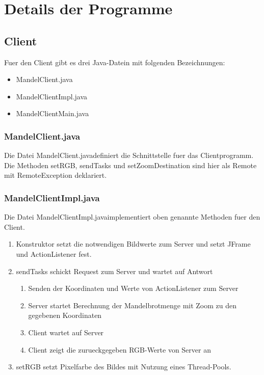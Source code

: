 \documentclass{article}
\begin{document}
\section{Details der Programme}
\subsection{Client}
	Fuer den Client gibt es drei Java-Datein mit folgenden Bezeichnungen:
	\begin{itemize}
		\item MandelClient.java
		\item MandelClientImpl.java
		\item MandelClientMain.java
	\end{itemize}
\subsubsection{MandelClient.java}
	Die Datei \glqq MandelClient.java\grqq definiert die Schnittstelle fuer das Clientprogramm. Die Methoden setRGB, sendTasks und setZoomDestination sind hier als Remote mit RemoteException deklariert.
	

	\newpage
\subsubsection{MandelClientImpl.java}
	Die Datei \glqq MandelClientImpl.java\grqq implementiert oben genannte Methoden fuer den Client.\\

	\begin{enumerate}
		\item Konstruktor setzt die notwendigen Bildwerte zum Server und setzt JFrame und ActionListener fest.\\
			
			\newpage
		\item sendTasks schickt Request zum Server und wartet auf Antwort\\
			\begin{enumerate}
				\item Senden der Koordinaten und Werte von ActionListener zum Server
				\item Server startet Berechnung der Mandelbrotmenge mit Zoom zu den gegebenen Koordinaten
				\item Client wartet auf Server
				\item Client zeigt die zurueckgegeben RGB-Werte von Server an
			\end{enumerate}
			
		\item setRGB setzt Pixelfarbe des Bildes mit Nutzung eines Thread-Pools.
			
	\end{enumerate}
	
\end{document}
